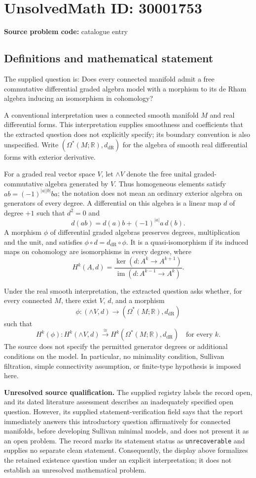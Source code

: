 \documentclass[11pt]{article}
\newcommand{\R}{\mathbb{R}}
\begin{document}
\section*{UnsolvedMath ID: 30001753}
\textbf{Source problem code:} catalogue entry
\subsection{Definitions and mathematical statement}
The supplied question is: Does every connected manifold admit a free commutative differential graded algebra model with a morphism to its de Rham algebra inducing an isomorphism in cohomology?

A conventional interpretation uses a connected smooth manifold \(M\) and real differential forms. This interpretation supplies smoothness and coefficients that the extracted question does not explicitly specify; its boundary convention is also unspecified. Write \((\Omega^*(M;\R),d_{\mathrm{dR}})\) for the algebra of smooth real differential forms with exterior derivative.

For a graded real vector space \(V\), let \(\wedge V\) denote the free unital graded-commutative algebra generated by \(V\). Thus homogeneous elements satisfy \(ab=(-1)^{|a||b|}ba\); the notation does not mean an ordinary exterior algebra on generators of every degree. A differential on this algebra is a linear map \(d\) of degree \(+1\) such that \(d^2=0\) and
\[
 d(ab)=d(a)b+(-1)^{|a|}a\,d(b).
\]
A morphism \(\phi\) of differential graded algebras preserves degrees, multiplication and the unit, and satisfies \(\phi\circ d=d_{\mathrm{dR}}\circ\phi\). It is a quasi-isomorphism if its induced maps on cohomology are isomorphisms in every degree, where
\[
 H^k(A,d)=\frac{\ker(d:A^k\to A^{k+1})}{\operatorname{im}(d:A^{k-1}\to A^k)}.
\]

Under the real smooth interpretation, the extracted question asks whether, for every connected \(M\), there exist \(V\), \(d\), and a morphism
\[
 \phi:(\wedge V,d)\longrightarrow(\Omega^*(M;\R),d_{\mathrm{dR}})
\]
such that
\[
 H^k(\phi):H^k(\wedge V,d)\xrightarrow{\;\cong\;}H^k(\Omega^*(M;\R),d_{\mathrm{dR}})
 \quad\text{for every }k.
\]
The source does not specify the permitted generator degrees or additional conditions on the model. In particular, no minimality condition, Sullivan filtration, simple connectivity assumption, or finite-type hypothesis is imposed here.

\textbf{Unresolved source qualification.} The supplied registry labels the record open, and its dated literature assessment describes an inadequately specified open question. However, its supplied statement-verification field says that the report immediately answers this introductory question affirmatively for connected manifolds, before developing Sullivan minimal models, and does not present it as an open problem. The record marks its statement status as \texttt{unrecoverable} and supplies no separate clean statement. Consequently, the display above formalizes the retained existence question under an explicit interpretation; it does not establish an unresolved mathematical problem.
\end{document}
